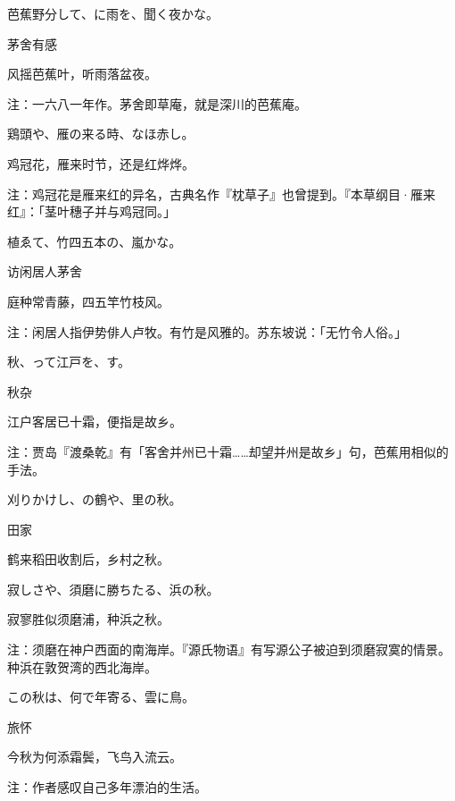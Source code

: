 \begin{haiku}
    {\FH 芭蕉野分して、に雨を、聞く夜かな。}

    {\FK 茅舍有感}

    {\FK 风摇芭蕉叶，听雨落盆夜。}

    {\FT 注：一六八一年作。茅舍即草庵，就是深川的芭蕉庵。}
\end{haiku}

\begin{haiku}
    {\FH 鶏頭や、雁の来る時、なほ赤し。}

    {\FK 鸡冠花，雁来时节，还是红烨烨。}

    {\FT 注：鸡冠花是雁来红的异名，古典名作『枕草子』也曾提到。『本草纲目·雁来红』：「茎叶穗子并与鸡冠同。」}
\end{haiku}

\begin{haiku}
    {\FH {}植ゑて、竹四五本の、嵐かな。}

    {\FK 访闲居人茅舍}

    {\FK 庭种常青藤，四五竿竹枝风。}

    {\FT 注：闲居人指伊势俳人卢牧。有竹是风雅的。苏东坡说：「无竹令人俗。」}
\end{haiku}

\begin{haiku}
    {\FH 秋、って江戸を、す。}

    {\FK 秋杂}

    {\FK 江户客居已十霜，便指是故乡。}

    {\FT 注：贾岛『渡桑乾』有「客舍并州已十霜……却望并州是故乡」句，芭蕉用相似的手法。}
\end{haiku}

\begin{haiku}
    {\FH 刈りかけし、の鶴や、里の秋。}

    {\FK 田家}

    {\FK 鹤来稻田收割后，乡村之秋。}
\end{haiku}

\begin{haiku}
    {\FH 寂しさや、須磨に勝ちたる、浜の秋。}

    {\FK 寂寥胜似须磨浦，种浜之秋。}

    {\FT 注：须磨在神户西面的南海岸。『源氏物语』有写源公子被迫到须磨寂寞的情景。种浜在敦贺湾的西北海岸。}
\end{haiku}

\begin{haiku}
    {\FH この秋は、何で年寄る、雲に鳥。}

    {\FK 旅怀}

    {\FK 今秋为何添霜鬓，飞鸟入流云。}

    {\FT 注：作者感叹自己多年漂泊的生活。}
\end{haiku}

